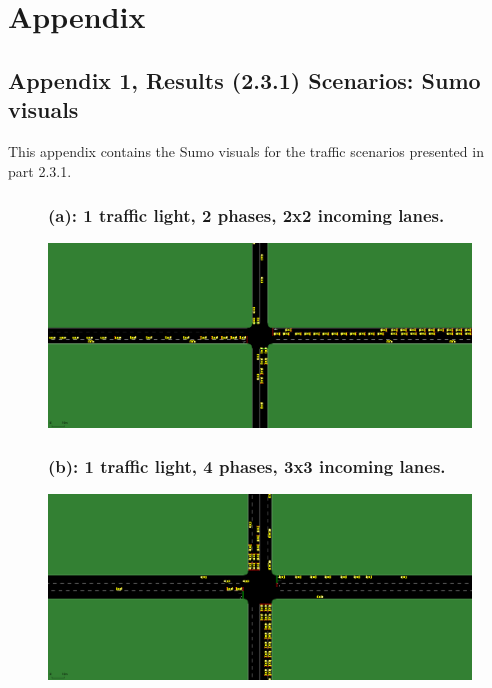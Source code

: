 \section*{Appendix}

\subsection*{Appendix 1, Results (2.3.1) Scenarios: Sumo visuals}

This appendix contains the Sumo visuals for the traffic scenarios presented in part 2.3.1. \\

\begin{figure}[h]
\subsubsection*{(a): 1 traffic light, 2 phases, 2x2 incoming lanes.}
\includegraphics[width=\textwidth]{img/Appendix/scenario_a.png}
\centering
\end{figure}

\begin{figure}[h]
\subsubsection*{(b): 1 traffic light, 4 phases, 3x3 incoming lanes.}
\includegraphics[width=\textwidth]{img/Appendix/scenario_b.png}
\centering
\end{figure}

